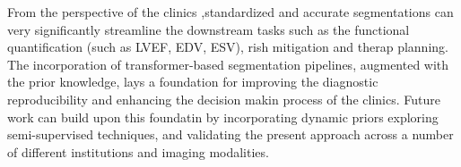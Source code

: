 From the perspective of the clinics ,standardized and accurate segmentations can very significantly streamline the downstream tasks such as the functional quantification (such as LVEF, EDV, ESV), rish mitigation and therap planning. The incorporation of transformer-based segmentation pipelines, augmented with the prior knowledge, lays a foundation for improving the diagnostic reproducibility and enhancing the decision makin process of the clinics. Future work can build upon this foundatin by incorporating dynamic priors exploring semi-supervised techniques, and validating the present approach across a number of different institutions and imaging modalities.
